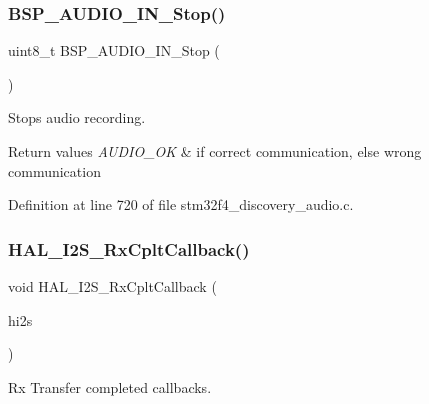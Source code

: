 \subsubsection{\texorpdfstring{B\+S\+P\+\_\+\+A\+U\+D\+I\+O\+\_\+\+I\+N\+\_\+\+Stop()}{BSP\_AUDIO\_IN\_Stop()}}
{\footnotesize\ttfamily uint8\+\_\+t B\+S\+P\+\_\+\+A\+U\+D\+I\+O\+\_\+\+I\+N\+\_\+\+Stop (\begin{DoxyParamCaption}\item[{void}]{ }\end{DoxyParamCaption})}



Stops audio recording. 


\begin{DoxyRetVals}{Return values}
{\em A\+U\+D\+I\+O\+\_\+\+OK} & if correct communication, else wrong communication \\
\hline
\end{DoxyRetVals}


Definition at line 720 of file stm32f4\+\_\+discovery\+\_\+audio.\+c.

\mbox{\label{group___s_t_m32_f4___d_i_s_c_o_v_e_r_y___a_u_d_i_o___i_n___private___functions_ga18c33b2d429b06674ec30e5b2b81862c}} 
\subsubsection{\texorpdfstring{H\+A\+L\+\_\+\+I2\+S\+\_\+\+Rx\+Cplt\+Callback()}{HAL\_I2S\_RxCpltCallback()}}
{\footnotesize\ttfamily void H\+A\+L\+\_\+\+I2\+S\+\_\+\+Rx\+Cplt\+Callback (\begin{DoxyParamCaption}\item[{I2\+S\+\_\+\+Handle\+Type\+Def $\ast$}]{hi2s }\end{DoxyParamCaption})}



Rx Transfer completed callbacks. 


